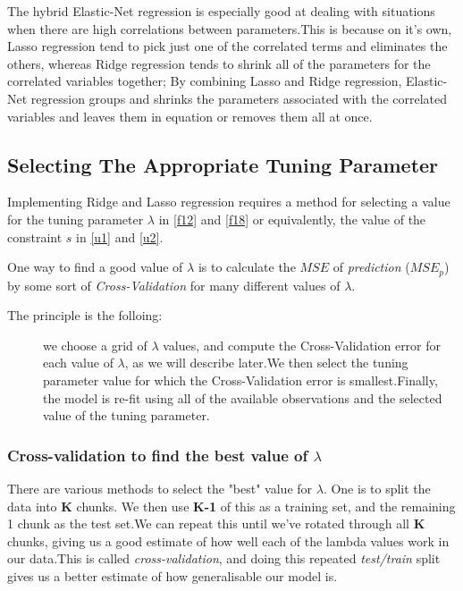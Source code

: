 \documentclass[12pt]{report}
\renewcommand{\emph}{\textit}
\begin{document}
	The hybrid Elastic-Net regression is especially good at dealing with situations when there are high correlations between parameters.This is because on it's own, Lasso regression tend to pick just one of the correlated terms and eliminates the others, whereas Ridge regression tends to shrink all of the parameters for the correlated variables together; By combining Lasso and Ridge regression, Elastic-Net regression groups and shrinks the parameters associated with the correlated variables and leaves them in equation or removes them all at once.
	\subsection{Selecting The Appropriate Tuning Parameter}
	Implementing Ridge and Lasso regression requires a method for selecting a value for the tuning parameter $\lambda$ in \eqref{f12} and \eqref{f18} or equivalently, the value of the constraint $s$ in \eqref{u1} and \eqref{u2}.
	
	One way to find a good value of $\lambda$ is to calculate the $MSE$ of \emph{prediction} ($MSE_{p}$) by some sort of \emph{Cross-Validation} for many different values of $\lambda$.
	
	\begin{description}
		\item[The principle is the folloing:] we choose a grid of $\lambda$ values, and compute the Cross-Validation error for each value of $\lambda$, as we will describe later.We then select the tuning parameter value for which the Cross-Validation error is smallest.Finally, the model is re-fit using all of the available observations and the selected value of the tuning parameter.
	\end{description}
	\begin{center}
		\subsubsection{Cross-validation to find the best value of $\lambda$}
	\end{center}
	There are various methods to select the "best" value for $\lambda$. One is to split the data into \textbf{K} chunks. We then use \textbf{K-1} of this as a training set, and the remaining 1 chunk as the test set.We can repeat this until we've rotated through all \textbf{K} chunks, giving us a good estimate of how well each of the lambda values work in our data.This is called \emph{cross-validation}, and doing this repeated \emph{test/train} split gives us a better estimate of how generalisable our model is.
	
\end{document}
